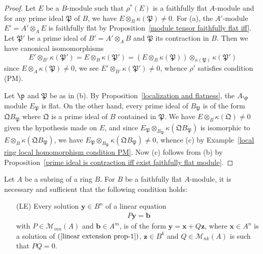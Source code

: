 \begin{proof}
Let $E$ be a $B$-module such that $\rho^*(E)$ is a faithfully flat $A$-module and for any prime ideal $\mathfrak{P}$ of $B$, we have $E\otimes_B\kappa(\mathfrak{P})\neq 0$. For (a), the $A'$-module $E'=A'\otimes_AE$ is faithfully flat by Proposition~\ref{module tensor faithfully flat iff}. Let $\mathfrak{P}'$ be a prime ideal of $B'=A'\otimes_AB$ and $\mathfrak{P}$ its contraction in $B$. Then we have canonical isomomorphisms
\[E'\otimes_{B'}\kappa(\mathfrak{P}')=E\otimes_B\kappa(\mathfrak{P}')=(E\otimes_B\kappa(\mathfrak{P}))\otimes_{\kappa(\mathfrak{P})}\kappa(\mathfrak{P}')\]
since $E\otimes_A\kappa(\mathfrak{P})\neq 0$, we see $E'\otimes_{B'}\kappa(\mathfrak{P}')\neq 0$, whence $\rho'$ satisfies condition (PM).\par 
Let $\p$ and $\mathfrak{P}$ be as in (b). By Proposition~\ref{localization and flatness}, the $A_\p$ module $E_{\mathfrak{P}}$ is flat. On the other hand, every prime ideal of $B_{\mathfrak{P}}$ is of the form $\mathfrak{Q}B_{\mathfrak{P}}$ where $\mathfrak{Q}$ is a prime ideal of $B$ contained in $\mathfrak{P}$. We have $E\otimes_B\kappa(\mathfrak{Q})\neq 0$ given the hypothesis made on $E$, and since $E_{\mathfrak{P}}\otimes_{B_{\mathfrak{P}}}\kappa(\mathfrak{Q}B_{\mathfrak{P}})$ is isomorphic to $E\otimes_B\kappa(\mathfrak{Q}B_{\mathfrak{P}})$, we have $E_{\mathfrak{P}}\otimes_{B_{\mathfrak{P}}}\kappa(\mathfrak{Q}B_{\mathfrak{P}})\neq 0$, whence (c) by Example~\ref{local ring local homomorphism condition PM}. Now (c) follows from (b) by Proposition~\ref{prime ideal is contraction iff exist faithfully flat module}.
\end{proof}
\begin{proposition}\label{module faithfully flat iff linear relation}
Let $A$ be a subring of a ring $B$. For $B$ be a faithfully flat $A$-module, it is necessary and sufficient that the following condition holds:
\begin{enumerate}
\item[(LE)] Every solution $\bm{y}\in B^n$ of a linear equation
\begin{align}\label{linear extension prop-1}
P\bm{y}=\bm{b}
\end{align}
with $P\in\mathcal{M}_{mn}(A)$ and $\bm{b}\in A^m$, is of the form $\bm{y}=\bm{x}+Q\bm{z}$, where $\bm{x}\in A^n$ is a solution of $(\ref{linear extension prop-1})$, $\bm{z}\in B^k$ and $Q\in\mathcal{M}_{nk}(A)$ is such that $PQ=0$.
\end{enumerate}
\end{proposition}

